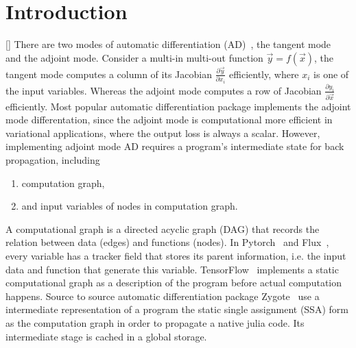 \documentclass[aps,twocolumn,longbibliography,english,superscriptaddress,prr]{revtex4-1}
\newcommand{\<}{\langle}
\renewcommand{\>}{\rangle}
\newcommand{\vx}{{\vec x}}
\newcommand{\vy}{{\vec y}}
\newcommand{\blue}[1]{[{\bf  \color{blue}{JG: #1}}]}
\theoremstyle{definition}\newtheorem{definition}{\textit{Definition}}
\begin{document}
\section{Introduction}\label{sec:intro}
    \blue{TODOs: show benchmark, quantum example? recursive gradient approach to obtain hessian}
    There are two modes of automatic differentiation (AD)~\cite{Hascoet2013}, the tangent mode~\cite{Revels2016} and the adjoint mode.
    Consider a multi-in multi-out function $\vy = f(\vx)$, the tangent mode computes a column of its Jacobian $\frac{\partial \vy}{\partial x_i}$ efficiently, where $x_i$ is one of the input variables.
Whereas the adjoint mode computes a row of Jacobian $\frac{\partial y_i}{\partial \vec{x}}$ efficiently.
Most popular automatic differentiation package implements the adjoint mode differentation, since the adjoint mode is computational more efficient in variational applications, where the output loss is always a scalar.
However, implementing adjoint mode AD requires a program's intermediate state for back propagation, including
\begin{enumerate}
    \item computation graph,
    \item and input variables of nodes in computation graph.
\end{enumerate}
    A computational graph is a directed acyclic graph (DAG) that records the relation between data (edges) and functions (nodes).
In Pytorch~\cite{Paszke2017} and Flux~\cite{Innes2018}, every variable has a tracker field that stores its parent information, i.e. the input data and function that generate this variable. TensorFlow~\cite{Tensorflow2015} implements a static computational graph as a description of the program before actual computation happens.
    Source to source automatic differentiation package Zygote~\cite{Innes2018, Innes2019} use a intermediate representation of a program the static single assignment (SSA) form as the computation graph in order to propagate a native julia code. Its intermediate stage is cached in a global storage.
\end{document}
